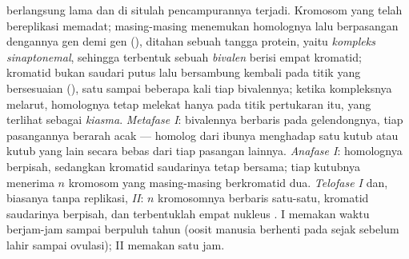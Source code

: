 \begin{proposition}\label{prop:b2:meiosis-heredity:stages}
\emph{} berlangsung lama dan di situlah pencampurannya
terjadi. Kromosom yang telah bereplikasi memadat; masing-masing
menemukan homolognya lalu berpasangan dengannya gen demi gen
(\emph{}), ditahan sebuah tangga protein, yaitu \emph{kompleks
sinaptonemal}, sehingga terbentuk sebuah \emph{bivalen} berisi empat
kromatid; kromatid bukan saudari putus lalu bersambung kembali pada
titik yang bersesuaian (\emph{}), satu sampai beberapa
kali tiap bivalennya; ketika kompleksnya melarut, homolognya tetap
melekat hanya pada titik pertukaran itu, yang terlihat sebagai
\emph{kiasma}. \emph{Metafase I}: bivalennya berbaris pada
gelendongnya, tiap pasangannya berarah acak --- homolog dari ibunya
menghadap satu kutub atau kutub yang lain secara bebas dari tiap
pasangan lainnya. \emph{Anafase I}: homolognya berpisah, sedangkan
kromatid saudarinya tetap bersama; tiap kutubnya menerima $n$ kromosom
yang masing-masing berkromatid dua. \emph{Telofase I} dan, biasanya
tanpa replikasi, \emph{ II}: $n$ kromosomnya
berbaris satu-satu, kromatid saudarinya berpisah, dan terbentuklah
empat nukleus .  I memakan waktu berjam-jam sampai
berpuluh tahun (oosit manusia berhenti pada  sejak sebelum
lahir sampai ovulasi);  II memakan satu jam.
\end{proposition}


